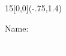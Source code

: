 \documentclass[british,german,11pt]{scrartcl}    %
\begin{document}
\begin{textblock}{15}[0,0](-.75,1.4)
\huge \textbf{\thetitle}\normalsize

\thedate
\vspace{1cm}

Name:
\end{textblock}

\thispagestyle{firstpage}

\RaggedRight

\textcolor{white}{x}
\vspace{5cm}


\end{document}
